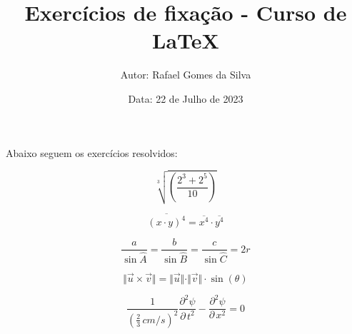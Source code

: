 \documentclass[12pt]{article}
\title{\textbf{Exercícios de fixação - Curso de LaTeX}}
\author{Autor: Rafael Gomes da Silva}
\date{Data: 22 de Julho de 2023}
\begin{document}
\maketitle

Abaixo seguem os exercícios resolvidos:

\begin{equation}
	\sqrt[3]{\left(\frac{2^{3}+2^{5}}{10}\right)}
\end{equation}

\begin{equation}
	\overline{(x \cdot y)^{4}} = \overline{x^{4}} \cdot \overline{y^{4}}
\end{equation}

\begin{equation}
	\frac{a}{\sin \widehat{A}} = \frac{b}{\sin \widehat{B}} = \frac{c}{\sin \widehat{C}} = 2r
\end{equation}

\begin{equation}
	\Vert \vec{u} \times \vec{v} \Vert= \Vert \vec{u} \Vert \cdot \Vert \vec{v} \Vert \cdot \sin(\theta)
\end{equation}
   
\begin{equation}
	\frac{1}{\left(\frac{2}{3} \, cm/s \right)^2} \frac{\partial^{2}\psi}{\partial \, t^2} - \frac{\partial^{2}\psi}{\partial \, x^2} = 0
\end{equation}
   
\end{document}
